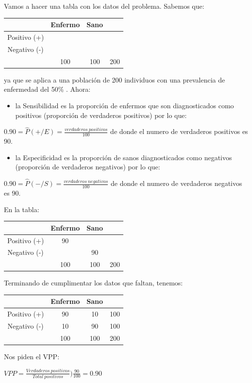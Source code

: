 \documentclass[
]{book}
\providecommand{\tightlist}{%
  \setlength{\itemsep}{0pt}\setlength{\parskip}{0pt}}
\begin{document}
Vamos a hacer una tabla con los datos del problema. Sabemos que:

\begin{longtable}[]{@{}cccc@{}}
\toprule
& Enfermo & Sano &\tabularnewline
\midrule
\endhead
Positivo (+) & & &\tabularnewline
Negativo (-) & & &\tabularnewline
& 100 & 100 & 200\tabularnewline
\bottomrule
\end{longtable}

ya que se aplica a una población de 200 individuos con una prevalencia de enfermedad del 50\% . Ahora:

\begin{itemize}
\tightlist
\item
  la Sensibilidad es la proporción de enfermos que son diagnosticados como positivos (proporción de verdaderos positivos) por lo que:
\end{itemize}

\(0.90 = \hat{P}(+/E) = \frac{verdaderos ~ positivos}{100}\) de donde el numero de verdaderos positivos es 90.

\begin{itemize}
\tightlist
\item
  la Especificidad es la proporción de sanos diagnosticados como negativos (proporción de verdaderos negativos) por lo que:
\end{itemize}

\(0.90 = \hat{P}(-/S) = \frac{verdaderos ~ negativos}{100}\) de donde el numero de verdaderos negativos es 90.

En la tabla:

\begin{longtable}[]{@{}cccc@{}}
\toprule
& Enfermo & Sano &\tabularnewline
\midrule
\endhead
Positivo (+) & 90 & &\tabularnewline
Negativo (-) & & 90 &\tabularnewline
& 100 & 100 & 200\tabularnewline
\bottomrule
\end{longtable}

Terminando de cumplimentar los datos que faltan, tenemos:

\begin{longtable}[]{@{}cccc@{}}
\toprule
& Enfermo & Sano &\tabularnewline
\midrule
\endhead
Positivo (+) & 90 & 10 & 100\tabularnewline
Negativo (-) & 10 & 90 & 100\tabularnewline
& 100 & 100 & 200\tabularnewline
\bottomrule
\end{longtable}

Nos piden el VPP:

\(VPP=\frac{Verdaderos ~ positivos}{Total ~ positivos})\frac{90}{100}=0.90\)
\end{document}
